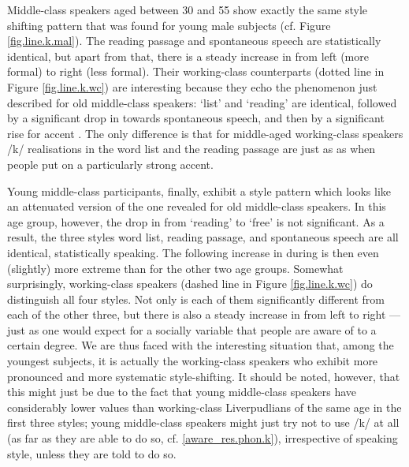 Middle-class speakers aged between 30 and 55 show exactly the same style shifting pattern that was found for young male subjects (cf. Figure \ref{fig.line.k.mal}).
The reading passage and spontaneous speech are statistically identical, but apart from that, there is a steady increase in  from left (more formal) to right (less formal).
Their working-class counterparts (dotted line in Figure \ref{fig.line.k.wc}) are interesting because they echo the phenomenon just described for old middle-class speakers: `list' and `reading' are identical, followed by a significant drop in  towards spontaneous speech, and then by a significant rise for accent .
The only difference is that for middle-aged working-class speakers /k/ realisations in the word list and the reading passage are just as  as when people put on a particularly strong  accent.

Young middle-class participants, finally, exhibit a style pattern which looks like an attenuated version of the one revealed for old middle-class speakers.
In this age group, however, the drop in  from `reading' to `free' is not significant.
As a result, the three styles word list, reading passage, and spontaneous speech are all identical, statistically speaking.
The following increase in  during  is then even (slightly) more extreme than for the other two age groups.
Somewhat surprisingly, working-class speakers (dashed line in Figure \ref{fig.line.k.wc}) do distinguish all four styles.
Not only is each of them significantly different from each of the other three, but there is also a steady increase in  from left to right --- just as one would expect for a socially  variable that people are aware of to a certain degree.
We are thus faced with the interesting situation that, among the youngest subjects, it is actually the working-class speakers who exhibit more pronounced and more systematic style-shifting.
It should be noted, however, that this might just be due to the fact that young middle-class speakers have considerably lower  values than working-class Liverpudlians of the same age in the first three styles; young middle-class speakers might just try not to use /k/  at all (as far as they are able to do so, cf. \ref{aware_res.phon.k}), irrespective of speaking style, unless they are told to do so.